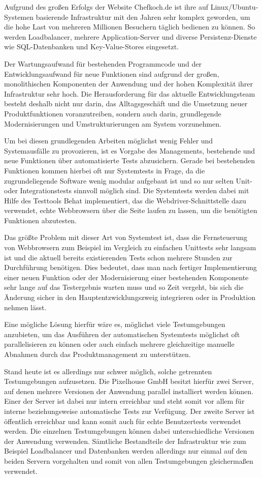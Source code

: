 Aufgrund des großen Erfolgs der Website Chefkoch.de ist ihre auf Linux/Ubuntu-Systemen basierende Infrastruktur mit den Jahren sehr komplex geworden, um die hohe Last von mehreren Millionen Besuchern täglich bedienen zu können. So werden Loadbalancer, mehrere Application-Server und diverse Persistenz-Dienste wie SQL-Datenbanken und Key-Value-Stores eingesetzt.

Der Wartungsaufwand für bestehenden Programmcode und der Entwicklungsaufwand für neue Funktionen sind aufgrund der großen, monolithischen Komponenten der Anwendung und der hohen Komplexität ihrer Infrastruktur sehr hoch. Die Herausforderung für das aktuelle Entwicklungsteam besteht deshalb nicht nur darin, das Alltagsgeschäft und die Umsetzung neuer Produktfunktionen voranzutreiben, sondern auch darin, grundlegende Modernisierungen und Umstrukturierungen am System vorzunehmen.

Um bei diesen grundlegenden Arbeiten möglichst wenig Fehler und Systemausfälle zu provozieren, ist es Vorgabe des Managements, bestehende und neue Funktionen über automatisierte Tests abzusichern. Gerade bei bestehenden Funktionen kommen hierbei oft nur Systemtests in Frage, da die zugrundeliegende Software wenig modular aufgebaut ist und so nur selten Unit- oder Integrationstests sinnvoll möglich sind. Die Systemtests werden dabei mit Hilfe des Testtools Behat implementiert, das die Webdriver-Schnittstelle dazu verwendet, echte Webbrowsern über die Seite laufen zu lassen, um die benötigten Funktionen abzutesten.

Das größte Problem mit dieser Art von Systemtest ist, dass die Fernsteuerung von Webbrowsern zum Beispiel im Vergleich zu einfachen Unittests sehr langsam ist und die aktuell bereits existierenden Tests schon mehrere Stunden zur Durchführung benötigen. Dies bedeutet, dass man nach fertiger Implementierung einer neuen Funktion oder der Modernisierung einer bestehenden Komponente sehr lange auf das Testergebnis warten muss und so Zeit vergeht, bis sich die Änderung sicher in den Hauptentzwicklungszweig integrieren oder in Produktion nehmen lässt.

Eine mögliche Lösung hierfür wäre es, möglichst viele Testumgebungen anzubieten, um das Ausführen der automatischen Systemtests möglichst oft parallelisieren zu können oder auch einfach mehrere gleichzeitige manuelle Abnahmen durch das Produktmanagement zu unterstützen.

Stand heute ist es allerdings nur schwer möglich, solche getrennten Testumgebungen aufzusetzen. Die Pixelhouse GmbH besitzt hierfür zwei Server, auf denen mehrere Versionen der Anwendung parallel installiert werden können. Einer der Server ist dabei nur intern erreichbar und steht somit vor allem für interne beziehungsweise automatische Tests zur Verfügung. Der zweite Server ist öffentlich erreichbar und kann somit auch für echte Benutzertests verwendet werden. Die einzelnen Testumgebungen können dabei unterschiedliche Versionen der Anwendung verwenden. Sämtliche Bestandteile der  Infrastruktur wie zum Beispiel Loadbalancer und Datenbanken werden allerdings nur einmal auf den beiden Servern vorgehalten und somit von allen Testumgebungen gleichermaßen verwendet.

